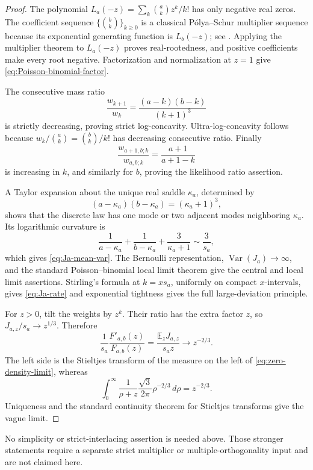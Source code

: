 \documentclass[11pt]{article}
\theoremstyle{keio}
\theoremstyle{definition}
\theoremstyle{remark}
\newcommand{\Var}{\operatorname{Var}}
\begin{document}
\begin{proof}
The polynomial \(L_a(-z)=\sum_k\binom akz^k/k!\) has only negative real
zeros.  The coefficient sequence \(\{\binom bk\}_{k\ge0}\) is a classical
P\'olya--Schur multiplier sequence because its exponential generating
function is \(L_b(-z)\); see \cite{PolyaSchur1914}.  Applying the multiplier
theorem to \(L_a(-z)\)
proves real-rootedness, and positive coefficients make every root negative.
Factorization and normalization at \(z=1\) give
\eqref{eq:Poisson-binomial-factor}.

The consecutive mass ratio
\[
 \frac{w_{k+1}}{w_k}=\frac{(a-k)(b-k)}{(k+1)^3}
\]
is strictly decreasing, proving strict log-concavity.  Ultra-log-concavity
follows because \(w_k/\binom ak=\binom bk/k!\) has decreasing consecutive
ratio.  Finally
\[
 \frac{w_{a+1,b;k}}{w_{a,b;k}}=\frac{a+1}{a+1-k}
\]
is increasing in \(k\), and similarly for \(b\), proving the likelihood
ratio assertion.

A Taylor expansion about the unique real saddle
\(\kappa_a\), determined by
\[
 (a-\kappa_a)(b-\kappa_a)=(\kappa_a+1)^3,
\]
shows that the discrete law has one mode or two adjacent modes neighboring
\(\kappa_a\).  Its logarithmic curvature is
\[
 \frac1{a-\kappa_a}+\frac1{b-\kappa_a}
 +\frac3{\kappa_a+1}\sim\frac3{s_a},
\]
which gives \eqref{eq:Ja-mean-var}.  The Bernoulli representation,
\(\Var(J_a)\to\infty\), and the standard Poisson--binomial local limit
theorem \cite[Chapter~VII]{Petrov1975} give the central and local limit
assertions.  Stirling's
formula at \(k=xs_a\), uniformly on compact \(x\)-intervals, gives
\eqref{eq:Ja-rate} and exponential tightness gives the full large-deviation
principle.

For \(z>0\), tilt the weights by \(z^k\).  Their ratio has the extra factor
\(z\), so \(J_{a,z}/s_a\to z^{1/3}\).  Therefore
\begin{equation}\label{eq:Stieltjes-transform-limit}
 \frac1{s_a}\frac{F'_{a,b}(z)}{F_{a,b}(z)}
 =\frac{\mathbb E_zJ_{a,z}}{s_az}\longrightarrow z^{-2/3}.
\end{equation}
The left side is the Stieltjes transform of the measure on the left of
\eqref{eq:zero-density-limit}, whereas
\[
 \int_0^\infty\frac1{\rho+z}
 \frac{\sqrt3}{2\pi}\rho^{-2/3}\,d\rho=z^{-2/3}.
\]
Uniqueness and the standard continuity theorem for Stieltjes transforms
\cite[Chapter~I]{Akhiezer1965} give the vague limit.
\end{proof}

No simplicity or strict-interlacing assertion is needed above.  Those
stronger statements require a separate strict multiplier or
multiple-orthogonality input and are not claimed here.
\end{document}
